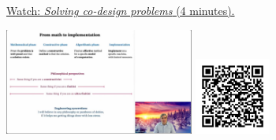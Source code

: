 
\begin{minipage}{10cm}
    \href{https://act4e-spring21.netlify.app/videos/spring2021-functorial-comp-a:solving-codesign.html}{Watch: \emph{Solving co-design problems} (4 minutes).}
        
    \href{https://act4e-spring21.netlify.app/videos/spring2021-functorial-comp-a:solving-codesign.html}{\includegraphics[height=3.5cm]{spring2021-functorial-comp-a:solving-codesign/thumbnails.jpg}}
    \href{https://act4e-spring21.netlify.app/videos/spring2021-functorial-comp-a:solving-codesign.html}{\includegraphics[height=2.5cm]{spring2021-functorial-comp-a:solving-codesign/qrcode.png}}
\end{minipage}
